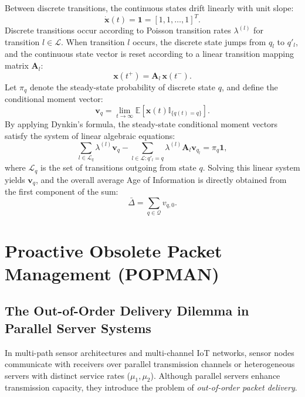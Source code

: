 Between discrete transitions, the continuous states drift linearly with unit slope:
\begin{equation}
    \dot{\mathbf{x}}(t) = \mathbf{1} = [1, 1, \dots, 1]^T.
\end{equation}
Discrete transitions occur according to Poisson transition rates $\lambda^{(l)}$ for transition $l \in \mathcal{L}$. When transition $l$ occurs, the discrete state jumps from $q_l$ to $q'_l$, and the continuous state vector is reset according to a linear transition mapping matrix $\mathbf{A}_l$:
\begin{equation}
    \mathbf{x}(t^+) = \mathbf{A}_l \, \mathbf{x}(t^-).
\end{equation}
Let $\pi_q$ denote the steady-state probability of discrete state $q$, and define the conditional moment vector:
\begin{equation}
    \mathbf{v}_q = \lim_{t \to \infty} \mathbb{E}[\mathbf{x}(t) \mathbb{I}_{\{q(t) = q\}}].
\end{equation}
By applying Dynkin's formula, the steady-state conditional moment vectors satisfy the system of linear algebraic equations:
\begin{equation}
    \sum_{l \in \mathcal{L}_{q}} \lambda^{(l)} \mathbf{v}_q - \sum_{l \in \mathcal{L}: q'_l = q} \lambda^{(l)} \mathbf{A}_l \mathbf{v}_{q_l} = \pi_q \mathbf{1},
\end{equation}
where $\mathcal{L}_q$ is the set of transitions outgoing from state $q$. Solving this linear system yields $\mathbf{v}_q$, and the overall average Age of Information is directly obtained from the first component of the sum:
\begin{equation}
    \bar{\Delta} = \sum_{q \in \mathcal{Q}} v_{q, 0}.
\end{equation}

\section{Proactive Obsolete Packet Management (POPMAN)}
\label{sec:popman_mechanisms}

\subsection{The Out-of-Order Delivery Dilemma in Parallel Server Systems}
In multi-path sensor architectures and multi-channel IoT networks, sensor nodes communicate with receivers over parallel transmission channels or heterogeneous servers with distinct service rates ($\mu_1, \mu_2$). Although parallel servers enhance transmission capacity, they introduce the problem of \emph{out-of-order packet delivery}.

